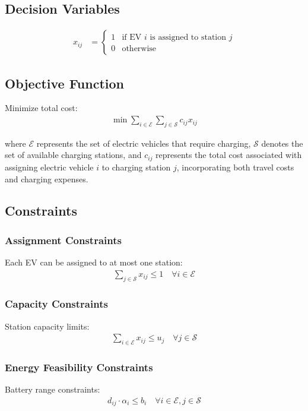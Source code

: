 \documentclass[12pt,a4paper]{article}
\begin{document}
\subsection{Decision Variables}

\begin{align}
x_{ij} &= \begin{cases}
1 & \text{if EV } i \text{ is assigned to station } j \\
0 & \text{otherwise}
\end{cases}
\end{align}

\subsection{Objective Function}

Minimize total cost:
\begin{align}
\min \sum_{i \in \mathcal{E}} \sum_{j \in \mathcal{S}} c_{ij} x_{ij}
\end{align}

where $\mathcal{E}$ represents the set of electric vehicles that require charging, $\mathcal{S}$ denotes the set of available charging stations, and $c_{ij}$ represents the total cost associated with assigning electric vehicle $i$ to charging station $j$, incorporating both travel costs and charging expenses.

\subsection{Constraints}

\subsubsection{Assignment Constraints}
Each EV can be assigned to at most one station:
\begin{align}
\sum_{j \in \mathcal{S}} x_{ij} \leq 1 \quad \forall i \in \mathcal{E}
\end{align}

\subsubsection{Capacity Constraints}
Station capacity limits:
\begin{align}
\sum_{i \in \mathcal{E}} x_{ij} \leq u_j \quad \forall j \in \mathcal{S}
\end{align}

\subsubsection{Energy Feasibility Constraints}
Battery range constraints:
\begin{align}
d_{ij} \cdot \alpha_i \leq b_i \quad \forall i \in \mathcal{E}, j \in \mathcal{S}
\end{align}
\end{document}
